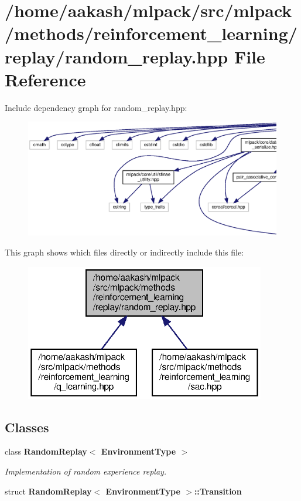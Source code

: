 \section{/home/aakash/mlpack/src/mlpack/methods/reinforcement\+\_\+learning/replay/random\+\_\+replay.hpp File Reference}
\label{random__replay_8hpp}
Include dependency graph for random\+\_\+replay.\+hpp\+:
\nopagebreak
\begin{figure}[H]
\begin{center}
\leavevmode
\includegraphics[width=350pt]{random__replay_8hpp__incl}
\end{center}
\end{figure}
This graph shows which files directly or indirectly include this file\+:
\nopagebreak
\begin{figure}[H]
\begin{center}
\leavevmode
\includegraphics[width=298pt]{random__replay_8hpp__dep__incl}
\end{center}
\end{figure}
\subsection*{Classes}
\begin{DoxyCompactItemize}
\item 
class \textbf{ Random\+Replay$<$ Environment\+Type $>$}
\begin{DoxyCompactList}\small\item\em Implementation of random experience replay. \end{DoxyCompactList}\item 
struct \textbf{ Random\+Replay$<$ Environment\+Type $>$\+::\+Transition}
\end{DoxyCompactItemize}
